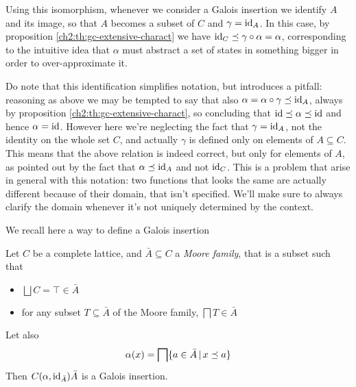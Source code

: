 Using this isomorphism, whenever we consider a Galois insertion we identify $A$ and its image, so that $A$ becomes a subset of $C$ and $\gamma = \text{id}_A$. In this case, by proposition \ref{ch2:th:gc-extensive-charact} we have $\text{id}_C \preceq \gamma \circ \alpha = \alpha$, corresponding to the intuitive idea that $\alpha$ must abstract a set of states in something bigger in order to over-approximate it.

Do note that this identification simplifies notation, but introduces a pitfall: reasoning as above we may be tempted to say that also $\alpha = \alpha \circ \gamma \preceq \text{id}_A$, always by proposition \ref{ch2:th:gc-extensive-charact}, so concluding that $\text{id} \preceq \alpha \preceq \text{id}$ and hence $\alpha = \text{id}$. However here we're neglecting the fact that $\gamma = \text{id}_A$, not the identity on the whole set $C$, and actually $\gamma$ is defined only on elements of $A \subseteq C$. This means that the above relation is indeed correct, but only for elements of $A$, as pointed out by the fact that $\alpha \preceq \text{id}_A$ and not $\text{id}_C$. This is a problem that arise in general with this notation: two functions that looks the same are actually different because of their domain, that isn't specified. We'll make sure to always clarify the domain whenever it's not uniquely determined by the context.

We recall here a  way to define a Galois insertion
\begin{prop}\label{ch2:th:gi-moore-family}
	Let $C$ be a complete lattice, and $\bar{A} \subseteq C$ a \textit{Moore family}, that is a subset such that
	\begin{itemize}
		\item $\bigsqcup C = \top \in \bar{A}$
		\item for any subset $T \subseteq \bar{A}$ of the Moore family, $\bigsqcap T \in \bar{A}$
	\end{itemize}
	Let also
	\[
	\alpha(x) = \bigsqcap \{ a \in \bar{A} \,\vert\, x \preceq a \}
	\]
	Then $C(\alpha, \text{id}_{\bar{A}}) \bar{A}$ is a Galois insertion.
\end{prop}

